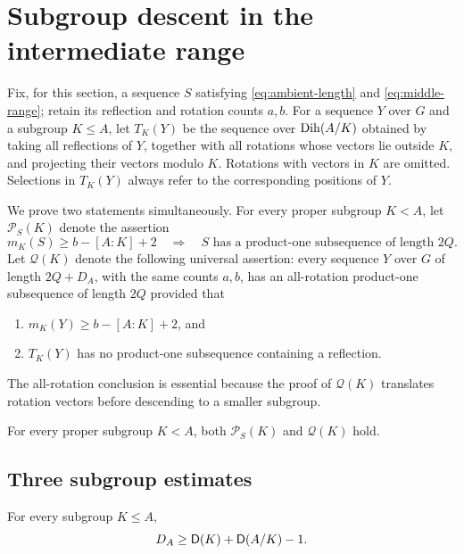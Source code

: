 \section{Subgroup descent in the intermediate range}
\label{sec:subgroup-descent}

Fix, for this section, a sequence \(S\) satisfying
\eqref{eq:ambient-length} and \eqref{eq:middle-range}; retain its
reflection and rotation counts \(a,b\). For a sequence \(Y\) over
\(G\) and a subgroup \(K\le A\), let \(T_K(Y)\) be the sequence over
\(\operatorname{Dih}(A/K)\) obtained by taking all reflections of \(Y\), together
with all rotations whose vectors lie outside \(K\), and projecting their
vectors modulo \(K\). Rotations with vectors in \(K\) are omitted.
Selections in \(T_K(Y)\) always refer to the corresponding positions of
\(Y\).

We prove two statements simultaneously. For every proper subgroup
\(K<A\), let \(\mathcal P_S(K)\) denote the assertion
\[
  m_K(S)\ge b-[A:K]+2
  \quad\Longrightarrow\quad
  S\text{ has a product-one subsequence of length }2Q.
\]
Let \(\mathcal Q(K)\) denote the following universal assertion: every
sequence \(Y\) over \(G\) of length \(2Q+D_A\), with the same counts
\(a,b\), has an all-rotation product-one subsequence of length \(2Q\)
provided that
\begin{enumerate}
\item \(m_K(Y)\ge b-[A:K]+2\), and
\item \(T_K(Y)\) has no product-one subsequence containing a reflection.
\end{enumerate}
The all-rotation conclusion is essential because the proof of
\(\mathcal Q(K)\) translates rotation vectors before descending to a
smaller subgroup.

\begin{theorem}\label{thm:subgroup-descent}
For every proper subgroup \(K<A\), both \(\mathcal P_S(K)\) and
\(\mathcal Q(K)\) hold.
\end{theorem}

\subsection{Three subgroup estimates}

\begin{lemma}\label{lem:Davenport-inequality}
For every subgroup \(K\le A\),
\begin{equation}\label{eq:Davenport-inequality}
  D_A\ge \mathsf D(K)+\mathsf D(A/K)-1.
\end{equation}
\end{lemma}

